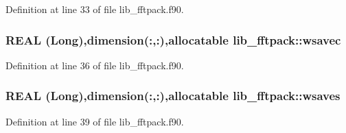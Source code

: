 Definition at line 33 of file lib\_\-fftpack.f90.

\hypertarget{namespacelib__fftpack_a45c5d0eb1be9cdebf49b3c56e861d0d6}{
\subsubsection[{wsavec}]{\setlength{\rightskip}{0pt plus 5cm}REAL (Long),dimension(:,:),allocatable {\bf lib\_\-fftpack::wsavec}}}
\label{namespacelib__fftpack_a45c5d0eb1be9cdebf49b3c56e861d0d6}


Definition at line 36 of file lib\_\-fftpack.f90.

\hypertarget{namespacelib__fftpack_a6ab9f0bc33149a5032987f2f843f883e}{
\subsubsection[{wsaves}]{\setlength{\rightskip}{0pt plus 5cm}REAL (Long),dimension(:,:),allocatable {\bf lib\_\-fftpack::wsaves}}}
\label{namespacelib__fftpack_a6ab9f0bc33149a5032987f2f843f883e}


Definition at line 39 of file lib\_\-fftpack.f90.

